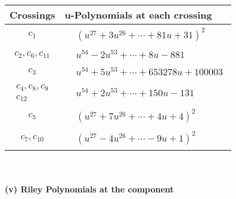 \documentclass[1p]{elsarticle_modified}
\theoremstyle{definition}
\begin{document}
\begin{tabular}{m{50pt}|m{274pt}}
Crossings & \hspace{64pt}u-Polynomials at each crossing \\
\hline $$\begin{aligned}c_{1}\end{aligned}$$&$\begin{aligned}
&(u^{27}+3 u^{26}+\cdots+81 u+31)^{2}
\end{aligned}$\\
\hline $$\begin{aligned}c_{2},c_{6},c_{11}\end{aligned}$$&$\begin{aligned}
&u^{54}-2 u^{53}+\cdots+8 u-881
\end{aligned}$\\
\hline $$\begin{aligned}c_{3}\end{aligned}$$&$\begin{aligned}
&u^{54}+5 u^{53}+\cdots+653278 u+100003
\end{aligned}$\\
\hline $$\begin{aligned}c_{4},c_{8},c_{9}\\c_{12}\end{aligned}$$&$\begin{aligned}
&u^{54}+2 u^{53}+\cdots+150 u-131
\end{aligned}$\\
\hline $$\begin{aligned}c_{5}\end{aligned}$$&$\begin{aligned}
&(u^{27}+7 u^{26}+\cdots+4 u+4)^{2}
\end{aligned}$\\
\hline $$\begin{aligned}c_{7},c_{10}\end{aligned}$$&$\begin{aligned}
&(u^{27}-4 u^{26}+\cdots-9 u+1)^{2}
\end{aligned}$\\
\hline
\end{tabular}\\~\\
\newpage\renewcommand{\arraystretch}{1}
\flushleft \textbf{(v) Riley Polynomials at the component}\newline \\
\end{document}
